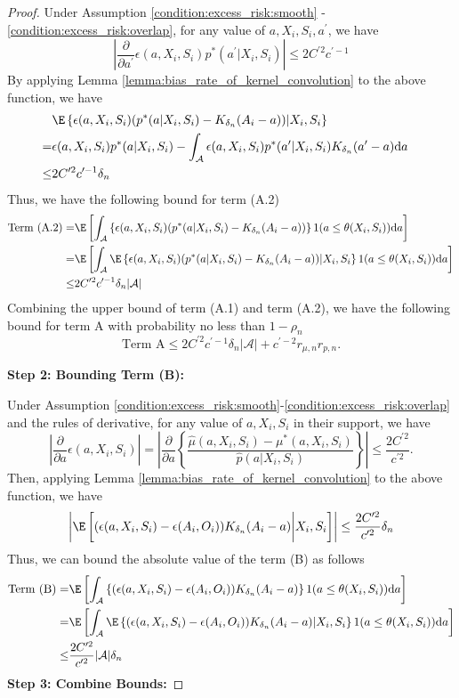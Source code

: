 \begin{proof}
\noindent Under Assumption \ref{condition:excess_risk:smooth} - \ref{condition:excess_risk:overlap}, for any value of $a,X_i,S_i,a^\prime$, we have 
$$\left|\frac{\partial}{\partial a^\prime}\epsilon(a,X_i,S_i)p^*(a^\prime|X_i,S_i)\right|\leq2C^{\prime2}c^{\prime-1}$$
By applying Lemma \ref{lemma:bias_rate_of_kernel_convolution} to the above function, we have 
\begin{align*}
    &\E\left\{ \epsilon(a,X_i,S_i)(p^*(a|X_i,S_i) - K_{\delta_n}(A_i-a))|X_i,S_i\right\}\\
    = & \epsilon(a,X_i,S_i)p^*(a|X_i,S_i) - \int_\mathcal{A}\epsilon(a,X_i,S_i)p^*(a^\prime|X_i,S_i)K_{\delta_n}(a^\prime - a)\mathrm{d}a\\
    \leq &2C^{\prime2}c^{\prime-1}\delta_n&
\end{align*}
Thus, we have the following bound for term (A.2)
\begin{align*}
    \text{Term (A.2)} = & \E\left[\int_{\mathcal{A}} \left\{ \epsilon(a,X_i,S_i)(p^*(a|X_i,S_i) - K_{\delta_n}(A_i-a))\right\}1(a\leq \theta(X_i,S_i))\mathrm{d}a\right]\\
    = & \E\left[\int_{\mathcal{A}} \E\left\{ \epsilon(a,X_i,S_i)(p^*(a|X_i,S_i) - K_{\delta_n}(A_i-a))|X_i,S_i\right\}1(a\leq \theta(X_i,S_i))\mathrm{d}a\right]\\
    \leq & 2C^{\prime2}c^{\prime-1}\delta_n|\mathcal{A}|
\end{align*}
Combining the upper bound of term (A.1) and term (A.2), we have the following bound for term A with probability no less than $1-\rho_n$
$$\text{Term A}\leq 2C^{\prime2}c^{\prime-1}\delta_n|\mathcal{A}| + c^{\prime-2}r_{\mu,n}r_{p,n}.$$


\noindent\textbf{Step 2: Bounding Term (B):}

\noindent Under Assumption \ref{condition:excess_risk:smooth}-\ref{condition:excess_risk:overlap} and the rules of derivative, for any value of $a,X_i,S_i$ in their support, we have 
$$ \left|\frac{\partial}{\partial a}\epsilon(a,X_i,S_i)\right|= \left|\frac{\partial}{\partial a}\left\{\frac{\widehat\mu(a,X_i,S_i) - \mu^*(a,X_i,S_i)}{\widehat p(a|X_i,S_i)}\right\}\right|\leq \frac{2C^{\prime2}}{c^{\prime2}}.$$
Then, applying Lemma \ref{lemma:bias_rate_of_kernel_convolution} to the above function, we have
$$\left|\E\left[ (\epsilon(a,X_i,S_i) - \epsilon(A_i,O_i)) K_{\delta_n}(A_i-a) \bigg| X_i,S_i\right] \right|\leq \frac{2C^{\prime2}}{c^{\prime2}}{\delta_n}$$
Thus, we can bound the absolute value of the term (B) as follows
\begin{align*}
    \text{Term (B)} =&\E\left[\int_{\mathcal{A}} \left\{(\epsilon(a,X_i,S_i) - \epsilon(A_i,O_i)) K_{\delta_n}(A_i-a)\right\}1(a\leq \theta(X_i,S_i))\mathrm{d}a\right]\\
    = & \E\left[\int_{\mathcal{A}} \E\left\{(\epsilon(a,X_i,S_i) - \epsilon(A_i,O_i)) K_{\delta_n}(A_i-a)|X_i,S_i\right\}1(a\leq \theta(X_i,S_i))\mathrm{d}a\right]\\
    \leq & \frac{2C^{\prime2}}{c^{\prime2}}|\mathcal{A}|{\delta_n}
\end{align*}
\noindent \textbf{Step 3: Combine Bounds:}


\end{proof}
